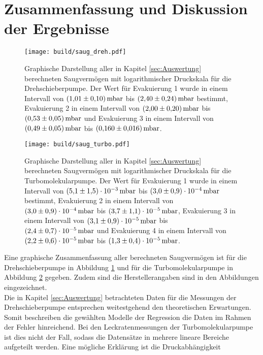 \section{Zusammenfassung und Diskussion der Ergebnisse}
\label{sec:Diskussion}
\begin{figure}[ht]
        \centering
        \texttt{[image: build/saug\_dreh.pdf]}
        \caption{Graphische Darstellung aller in Kapitel \ref{sec:Auswertung} berechneten Saugvermögen mit logarithmischer Druckskala für die Drehschieberpumpe. Der Wert für Evakuierung 1 wurde in einem Intervall von ${\SI{1.01 \pm 0.10}{\milli\bar}}$ bis ${\SI{2.40\pm 0.24}{\milli\bar}}$ bestimmt, Evakuierung 2 in einem Intervall von ${\SI{2.00 \pm 0.20}{\milli\bar}}$ bis ${\SI{0.53\pm 0.05}{\milli\bar}}$ und Evakuierung 3 in einem Intervall von ${\SI{0.49 \pm 0.05}{\milli\bar}}$ bis ${\SI{0.160 \pm 0.016}{\milli\bar}}$.}
        \label{fig:saug_dreh}
\end{figure}
\begin{figure}
        \centering
        \texttt{[image: build/saug\_turbo.pdf]}
        \caption{Graphische Darstellung aller in Kapitel \ref{sec:Auswertung} berechneten Saugvermögen mit logarithmischer Druckskala für die Turbomolekularpumpe. Der Wert für Evakuierung 1 wurde in einem Intervall von ${\SI{5.1 \pm 1.5 e-3}{\milli\bar}}$ bis ${\SI{3.0 \pm 0.9 e-4}{\milli\bar}}$ bestimmt, Evakuierung 2 in einem Intervall von ${\SI{3.0 \pm 0.9 e-4}{\milli\bar}}$ bis ${\SI{3.7 \pm 1.1 e-5}{\milli\bar}}$, Evakuierung 3 in einem Intervall von ${\SI{3.1 \pm 0.9 e-5}{\milli\bar}}$ bis ${\SI{2.4 \pm 0.7 e-5}{\milli\bar}}$ und Evakuierung 4 in einem Intervall von ${\SI{2.2 \pm 0.6 e-5}{\milli\bar}}$ bis ${\SI{1.3 \pm 0.4 e-5}{\milli\bar}}$.}
        \label{fig:saug_turbo}
\end{figure}
\noindent
Eine graphische Zusammenfassung aller berechneten Saugvermögen ist für die Drehschieberpumpe in 
Abbildung \ref{fig:saug_dreh} und für die Turbomolekularpumpe in Abbildung \ref{fig:saug_turbo} 
gegeben. Zudem sind die Herstellerangaben sind in den Abbildungen eingezeichnet.
\\
Die in Kapitel \ref{sec:Auswertung} betrachteten Daten für die Messungen der Drehschieberpumpe 
entsprechen weitestgehend den theoretischen Erwartungen. Somit beschreiben die gewählten 
Modelle der Regression die Daten im Rahmen der Fehler hinreichend. Bei den Leckratenmessungen
der Turbomolekularpumpe ist dies nicht der Fall, sodass die Datensätze in mehrere lineare
Bereiche aufgeteilt werden. Eine mögliche Erklärung ist die Druckabhängigkeit 
